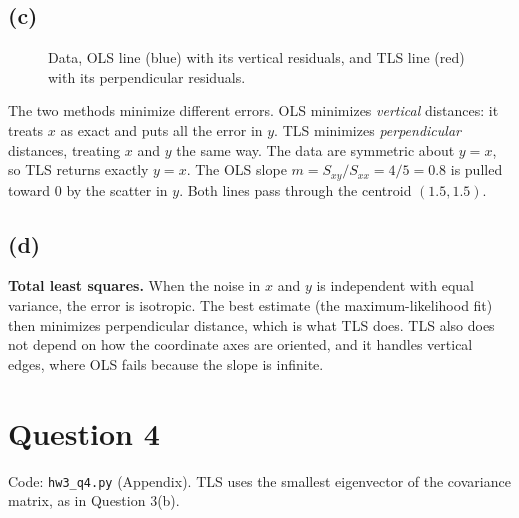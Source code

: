 \documentclass[11pt]{article}
\begin{document}
\subsection*{(c)}
\begin{figure}[H]\centering
{}
\caption{Data, OLS line (blue) with its vertical residuals, and TLS line (red) with its perpendicular residuals.}
\end{figure}
The two methods minimize different errors. OLS minimizes \emph{vertical} distances: it treats $x$ as exact and puts all the error in $y$. TLS minimizes \emph{perpendicular} distances, treating $x$ and $y$ the same way. The data are symmetric about $y=x$, so TLS returns exactly $y=x$. The OLS slope $m=S_{xy}/S_{xx}=4/5=0.8$ is pulled toward $0$ by the scatter in $y$. Both lines pass through the centroid $(1.5,1.5)$.

\subsection*{(d)}
\textbf{Total least squares.} When the noise in $x$ and $y$ is independent with equal variance, the error is isotropic. The best estimate (the maximum-likelihood fit) then minimizes perpendicular distance, which is what TLS does. TLS also does not depend on how the coordinate axes are oriented, and it handles vertical edges, where OLS fails because the slope is infinite.

\section*{Question 4}
Code: \texttt{hw3\_q4.py} (Appendix). TLS uses the smallest eigenvector of the covariance matrix, as in Question 3(b).
\end{document}
